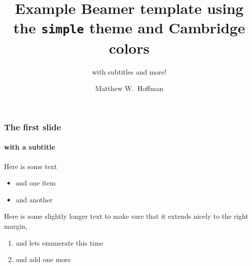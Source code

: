 \documentclass[t]{beamer}
\title{Example Beamer template using the \texttt{simple} theme and Cambridge
colors}
\subtitle{with subtitles and more!}
\author[M.W.Hoffman]{Matthew W.~Hoffman}
\institute[Cambridge]{University of Cambridge}
\begin{document}
\maketitle

\begin{frame}
    \frametitle{The first slide}
    \framesubtitle{with a subtitle}

    Here is some text
    \begin{itemize}
        \item and one item
        \item and another
    \end{itemize}

    \vspace{1em}
    Here is some slightly longer text to make sure that it extends nicely to 
    the right margin,
    \begin{enumerate}
        \item and lets enumerate this time
        \item and add one more
    \end{enumerate}
\end{frame}

\end{document}
